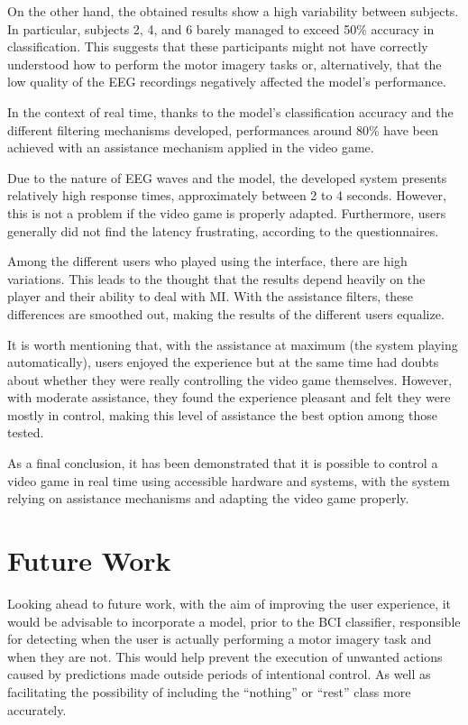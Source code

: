 On the other hand, the obtained results show a high variability between subjects. In particular, subjects 2, 4, and 6 barely managed to exceed 50\% accuracy in classification. This suggests that these participants might not have correctly understood how to perform the motor imagery tasks or, alternatively, that the low quality of the EEG recordings negatively affected the model's performance.

In the context of real time, thanks to the model's classification accuracy and the different filtering mechanisms developed, performances around 80\% have been achieved with an assistance mechanism applied in the video game.

Due to the nature of EEG waves and the model, the developed system presents relatively high response times, approximately between 2 to 4 seconds. However, this is not a problem if the video game is properly adapted. Furthermore, users generally did not find the latency frustrating, according to the questionnaires.

Among the different users who played using the interface, there are high variations. This leads to the thought that the results depend heavily on the player and their ability to deal with MI. With the assistance filters, these differences are smoothed out, making the results of the different users equalize.

It is worth mentioning that, with the assistance at maximum (the system playing automatically), users enjoyed the experience but at the same time had doubts about whether they were really controlling the video game themselves. However, with moderate assistance, they found the experience pleasant and felt they were mostly in control, making this level of assistance the best option among those tested.

As a final conclusion, it has been demonstrated that it is possible to control a video game in real time using accessible hardware and systems, with the system relying on assistance mechanisms and adapting the video game properly.

\section*{Future Work}
\label{sec:trabajo_futuro}

Looking ahead to future work, with the aim of improving the user experience, it would be advisable to incorporate a model, prior to the BCI classifier, responsible for detecting when the user is actually performing a motor imagery task and when they are not. This would help prevent the execution of unwanted actions caused by predictions made outside periods of intentional control. As well as facilitating the possibility of including the ``nothing'' or ``rest'' class more accurately.

